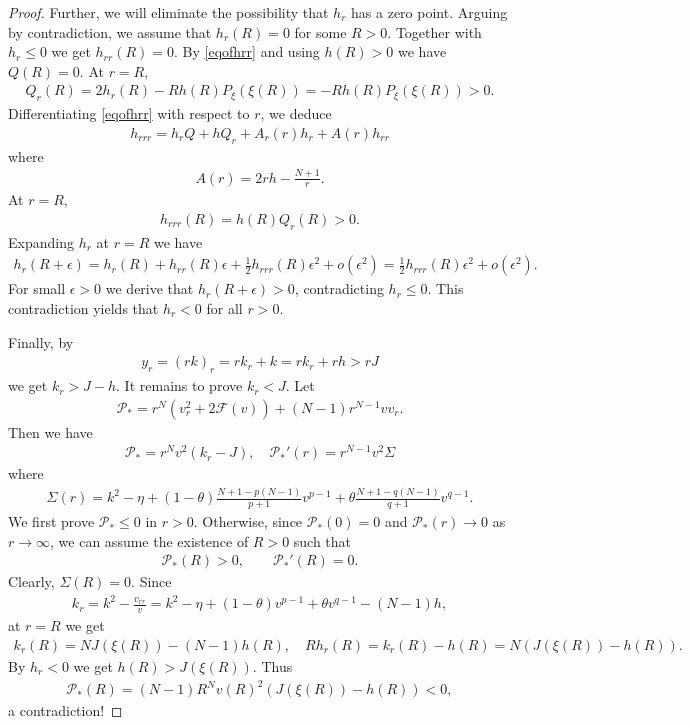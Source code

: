 \documentclass{article}
\theoremstyle{definition} \theoremstyle{remark}
\numberwithin{equation}{section}
\newcommand{\ep}{\epsilon}
\newcommand{\p}{\mathcal{P}}
\begin{document}
\begin{proof}
		Further, we will eliminate the possibility that $h_r$ has a zero point. Arguing by contradiction, we assume that $h_r(R) = 0$ for some $R > 0$. Together with $h_r \le 0$ we get $h_{rr}(R) = 0$. By \eqref{eqofhrr} and using $h(R) > 0$ we have $Q(R) = 0$. At $r = R$,
		\begin{align*}
			Q_r(R) = 2h_r(R) - Rh(R)P_\xi(\xi(R)) = - Rh(R)P_\xi(\xi(R)) > 0.
		\end{align*}
		Differentiating \eqref{eqofhrr} with respect to $r$, we deduce
		\begin{align*}
			h_{rrr} = h_rQ + hQ_r + A_r(r)h_r + A(r)h_{rr}
		\end{align*}
		where
		\begin{align*}
			A(r) = 2rh - \frac{N+1}{r}.
		\end{align*}
		At $r = R$,
		\begin{align*}
			h_{rrr}(R) = h(R)Q_r(R) > 0.
		\end{align*}
		Expanding $h_r$ at $r = R$ we have
		\begin{align*}
			h_r(R + \ep) = h_r(R) + h_{rr}(R)\ep + \frac12 h_{rrr}(R)\ep^2 + o(\ep^2) = \frac12 h_{rrr}(R)\ep^2 + o(\ep^2).
		\end{align*}
		For small $\ep > 0$ we derive that $h_r(R + \ep) > 0$, contradicting $h_r \le 0$. This contradiction yields that $h_r < 0$ for all $r > 0$.

		Finally, by
		\begin{align*}
			y_r = (rk)_r = r k_r + k = rk_r + rh > rJ
		\end{align*}
		we get $k_r > J - h$. It remains to prove $k_r < J$. Let
		\begin{align*}
			\p_* = r^N\left(v_r^2 + 2\mathcal{F}(v)\right) + (N-1)r^{N-1}vv_r.
		\end{align*}
	    Then we have
		\begin{align*}
			\p_* = r^Nv^2 \left(k_r - J\right), \quad \p_*'(r) = r^{N-1}v^2 \Sigma
		\end{align*}
		where
		\begin{align*}
			\Sigma(r) = k^2 - \eta + (1-\theta)\frac{N+1-p(N-1)}{p+1}v^{p-1} + \theta\frac{N+1-q(N-1)}{q+1}v^{q-1}.
		\end{align*}
		We first prove $\p_* \le 0$ in $r > 0$. Otherwise, since $\p_*(0) = 0$ and $\p_*(r) \to 0$ as $r \to \infty$, we can assume the existence of $R > 0$ such that
		\begin{align*}
			\p_*(R) > 0, \quad\quad \p_*'(R) = 0.
		\end{align*}
		Clearly, $\Sigma(R)  = 0$. Since
		\begin{align*}
			k_r = k^2 - \frac{v_{rr}}{v} = k^2 - \eta + (1-\theta)v^{p-1} + \theta v^{q-1} - (N-1)h,
		\end{align*}
		at $r = R$ we get
		\begin{align*}
			k_r(R) = N J(\xi(R)) - (N-1)h(R), \quad Rh_r(R) = k_r(R) - h(R) = N\left(J(\xi(R)) - h(R)\right).
		\end{align*}
		By $h_r < 0$ we get $h(R) > J(\xi(R))$. Thus
		\begin{align*}
			\p_*(R) = (N-1)R^{N}v(R)^2\left(J(\xi(R)) - h(R)\right) < 0,
		\end{align*}
		a contradiction!


\end{proof}
\end{document}
